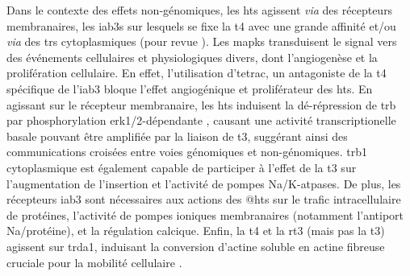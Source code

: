Dans le contexte des effets non-génomiques, les \glspl{ht} agissent \textit{via} des récepteurs membranaires, les \glspl{iab3} \citep{Bergh2005} sur lesquels se fixe la \gls{t4} avec une grande affinité et/ou \textit{via} des \glspl{tr} cytoplasmiques (pour revue \citet{Davis2008}).
Les \glspl{mapk} transduisent le signal vers des événements cellulaires et physiologiques divers, dont l'angiogenèse et la prolifération cellulaire.
En effet, l'utilisation d'\gls{tetrac}, un antagoniste de la \gls{t4} spécifique de l'\gls{iab3} bloque l'effet angiogénique et proliférateur des \glspl{ht}.
En agissant sur le récepteur membranaire, les \glspl{ht} induisent la dé-répression de \gls{trb} par phosphorylation \gls{erk}1/2-dépendante \citep{Davis2000}, causant une activité transcriptionelle basale pouvant être amplifiée par la liaison de \gls{t3}, suggérant ainsi des communications croisées entre voies génomiques et non-génomiques.
\gls{trb}1 cytoplasmique est également capable de participer à l'effet de la \gls{t3} sur l'augmentation de l'insertion et l'activité de pompes \gls{Na}/\gls{K}-\gls{atp}ases.
De plus, les récepteurs \gls{iab3} sont nécessaires aux actions des @\glspl{ht} sur le trafic intracellulaire de protéines, l'activité de pompes ioniques membranaires (notamment l'antiport \gls{Na}/protéine), et la régulation calcique.
Enfin, la \gls{t4} et la \gls{rt3} (mais pas la \gls{t3}) agissent sur \gls{trda}1, induisant la conversion d'actine soluble en actine fibreuse cruciale pour la mobilité cellulaire \citep{Safran1993,Leonard2006}.



